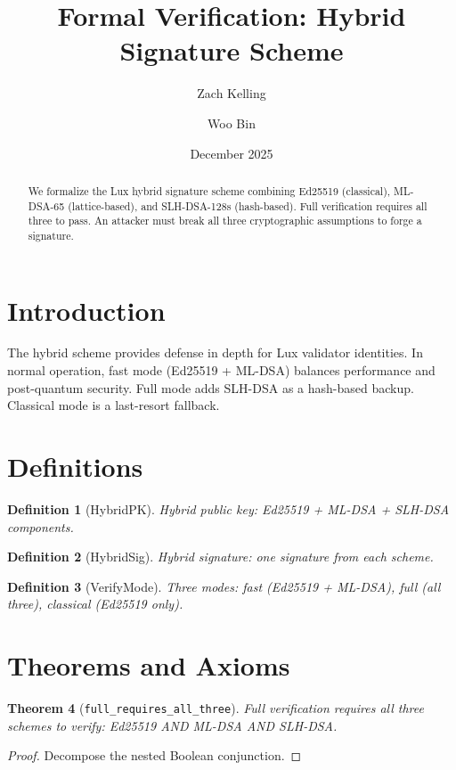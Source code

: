 \documentclass[11pt]{article}
\title{Formal Verification: Hybrid Signature Scheme}
\author{Zach Kelling \and Woo Bin}
\date{December 2025}
\newtheorem{theorem}{Theorem}
\newtheorem{definition}[theorem]{Definition}
\begin{document}
\maketitle

\begin{abstract}
We formalize the Lux hybrid signature scheme combining Ed25519 (classical), ML-DSA-65 (lattice-based), and SLH-DSA-128s (hash-based). Full verification requires all three to pass. An attacker must break all three cryptographic assumptions to forge a signature.
\end{abstract}

\section{Introduction}
The hybrid scheme provides defense in depth for Lux validator identities. In normal operation, fast mode (Ed25519 + ML-DSA) balances performance and post-quantum security. Full mode adds SLH-DSA as a hash-based backup. Classical mode is a last-resort fallback.

\section{Definitions}
\begin{definition}[HybridPK]
Hybrid public key: Ed25519 + ML-DSA + SLH-DSA components.
\end{definition}

\begin{definition}[HybridSig]
Hybrid signature: one signature from each scheme.
\end{definition}

\begin{definition}[VerifyMode]
Three modes: fast (Ed25519 + ML-DSA), full (all three), classical (Ed25519 only).
\end{definition}


\section{Theorems and Axioms}
\begin{theorem}[\texttt{full\_requires\_all\_three}]
Full verification requires all three schemes to verify: Ed25519 AND ML-DSA AND SLH-DSA.
\end{theorem}
\begin{proof}
Decompose the nested Boolean conjunction.
\end{proof}
\end{document}
